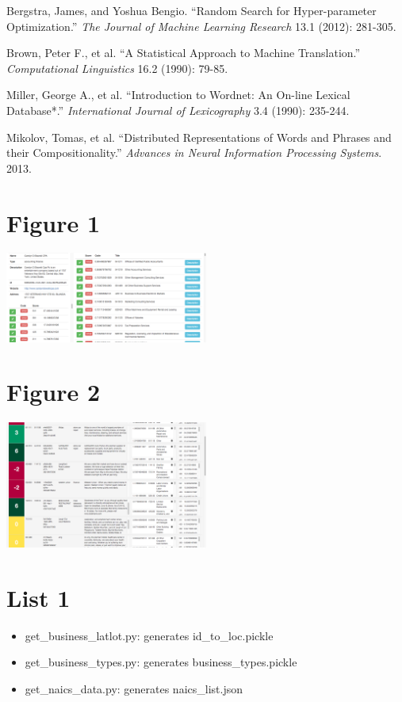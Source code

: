 \documentclass[letterpaper, 10 pt, conference]{IEEEtran}
\begin{document}
\begin{thebibliography}{99}

 Bergstra, James, and Yoshua Bengio. ``Random Search for Hyper-parameter Optimization.'' \textit{The Journal of Machine Learning Research} 13.1 (2012): 281-305.

 Brown, Peter F., et al. ``A Statistical Approach to Machine Translation.'' \textit{Computational Linguistics} 16.2 (1990): 79-85.

 Miller, George A., et al. ``Introduction to Wordnet: An On-line Lexical Database*.'' \textit{International Journal of Lexicography} 3.4 (1990): 235-244.

 Mikolov, Tomas, et al. ``Distributed Representations of Words and Phrases and their Compositionality.'' \textit{Advances in Neural Information Processing Systems}. 2013.

\end{thebibliography}

\addtolength{\textheight}{-12cm}   %

\newpage

\appendix
\section*{Figure 1}
\includegraphics[width=0.5\textwidth]{handclassifier.png}

\section*{Figure 2}
\includegraphics[width=0.5\textwidth]{database.png}

\section*{List 1}
\begin{itemize}
\item get\_business\_latlot.py: generates id\_to\_loc.pickle
\item get\_business\_types.py: generates business\_types.pickle
\item get\_naics\_data.py: generates naics\_list.json
\end{itemize}
\end{document}
